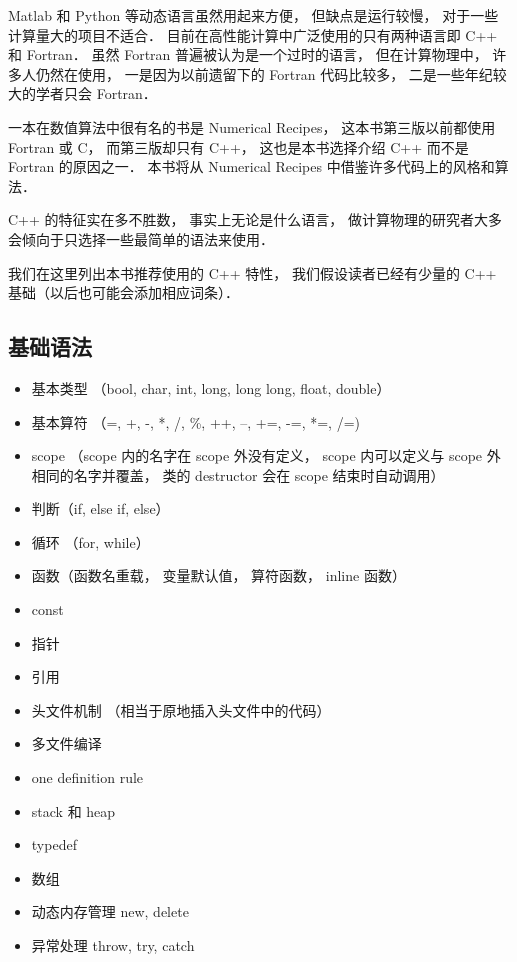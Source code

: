 
Matlab 和 Python 等动态语言虽然用起来方便， 但缺点是运行较慢， 对于一些计算量大的项目不适合． 目前在高性能计算中广泛使用的只有两种语言即 C++ 和 Fortran． 虽然 Fortran 普遍被认为是一个过时的语言， 但在计算物理中， 许多人仍然在使用， 一是因为以前遗留下的 Fortran 代码比较多， 二是一些年纪较大的学者只会 Fortran．

一本在数值算法中很有名的书是 Numerical Recipes， 这本书第三版以前都使用 Fortran 或 C， 而第三版却只有 C++， 这也是本书选择介绍 C++ 而不是 Fortran 的原因之一． 本书将从 Numerical Recipes 中借鉴许多代码上的风格和算法．

C++ 的特征实在多不胜数， 事实上无论是什么语言， 做计算物理的研究者大多会倾向于只选择一些最简单的语法来使用．

我们在这里列出本书推荐使用的 C++ 特性， 我们假设读者已经有少量的 C++ 基础（以后也可能会添加相应词条）．

\subsection{基础语法}
\begin{itemize}
\item 基本类型 （bool, char, int, long, long long, float, double）
\item 基本算符 （=, +, -, *, /, \%, ++, --, +=, -=, *=, /=)
\item scope （scope 内的名字在 scope 外没有定义， scope 内可以定义与 scope 外相同的名字并覆盖， 类的 destructor 会在 scope 结束时自动调用）
\item 判断（if, else if, else）
\item 循环 （for, while）
\item 函数（函数名重载， 变量默认值， 算符函数， inline 函数）
\item const
\item 指针
\item 引用
\item 头文件机制 （相当于原地插入头文件中的代码）
\item 多文件编译
\item one definition rule
\item stack 和 heap
\item typedef
\item 数组
\item 动态内存管理 new, delete
\item 异常处理 throw, try, catch
\end{itemize}

